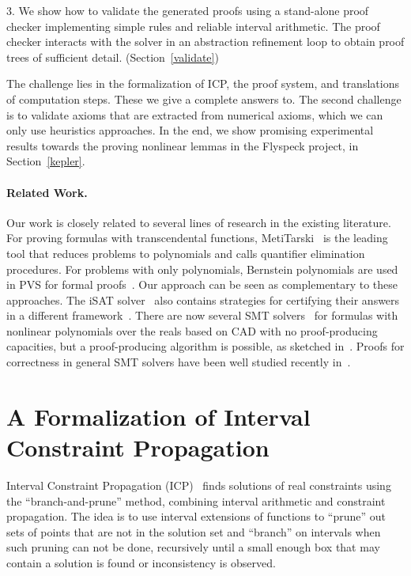 \documentclass[12pt]{article}
\begin{document}
3. We show how to validate the generated proofs using a stand-alone proof checker implementing simple rules and reliable interval arithmetic. The proof checker interacts with the solver in an abstraction refinement loop to obtain proof trees of sufficient detail. (Section~\ref{validate})

The challenge lies in the formalization of ICP, the proof system, and translations of computation steps. These we give a complete answers to. The second challenge is to validate axioms that are extracted from numerical axioms, which we can only use heuristics approaches. In the end, we show promising experimental results towards the proving nonlinear lemmas in the Flyspeck project, in Section~\ref{kepler}. 

\paragraph{Related Work.} Our work is closely related to several lines
of research in the existing literature. For proving formulas with
transcendental functions,
MetiTarski~\cite{DBLP:conf/itp/Paulson12,DBLP:journals/jar/AkbarpourP10,DBLP:conf/aisc/PassmorePM12}
is the leading tool that reduces problems to
polynomials and calls quantifier elimination procedures. For problems with only
polynomials, Bernstein polynomials are used in PVS for formal
proofs~\cite{MN12}. Our approach can be seen as complementary to these
approaches. The iSAT solver~\cite{HySAT} also contains strategies for certifying
their answers in a different framework~\cite{DBLP:conf/ddecs/KupferschmidBTF11}.
There are now several SMT
solvers~\cite{DBLP:conf/cade/JovanovicM12,DBLP:conf/mkm/PassmoreJ09} for formulas with nonlinear polynomials over
the reals based on CAD with no proof-producing capacities, but a proof-producing
algorithm is possible, as sketched in~\cite{DBLP:conf/cade/McLaughlinH05}. Proofs for
correctness in general SMT solvers have been well studied
 recently in~\cite{DBLP:journals/fmsd/StumpORHT13}.

\section{A Formalization of Interval Constraint Propagation}\label{formalization}

Interval Constraint Propagation (ICP)~\cite{handbookICP} finds
solutions of real constraints using the ``branch-and-prune'' method, combining
interval arithmetic and constraint propagation. The idea is to use interval
extensions of functions to ``prune'' out sets of points that are not in the
solution set and ``branch'' on intervals when
such pruning can not be done, recursively until a small enough box
that may contain a solution is found or inconsistency is observed.
\end{document}

